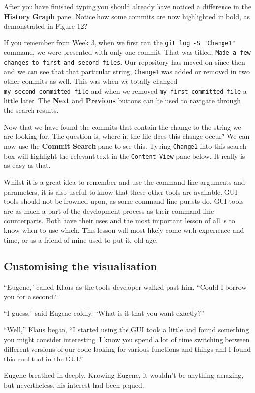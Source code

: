
After you have finished typing you should already have noticed a difference in the \textbf{History Graph} pane.
Notice how some commits are now highlighted in bold, as demonstrated in Figure 12?


If you remember from Week 3, when we first ran the \texttt{git log -S "Change1"} command, we were presented with only one commit.
That was titled, \texttt{Made a few changes to first and second files}.
Our repository has moved on since then and we can see that that particular string, \texttt{Change1} was added or removed in two other commits as well.
This was when we totally changed \texttt{my\_second\_committed\_file} and when we removed \texttt{my\_first\_committed\_file} a little later.
The \textbf{Next} and \textbf{Previous} buttons can be used to navigate through the search results.

Now that we have found the commits that contain the change to the string we are looking for.
The question is, where in the file does this change occur? We can now use the \textbf{Commit Search} pane to see this.
Typing \texttt{Change1} into this search box will highlight the relevant text in the \texttt{Content View} pane below.
It really is as easy as that.

Whilst it is a great idea to remember and use the command line arguments and parameters, it is also useful to know that these other tools are available.
GUI tools should not be frowned upon, as some command line purists do.
GUI tools are as much a part of the development process as their command line counterparts.
Both have their uses and the most important lesson of all is to know when to use which.
This lesson will most likely come with experience and time, or as a friend of mine used to put it, old age.

\subsection{Customising the visualisation}

\begin{trenches}
``Eugene,'' called Klaus as the tools developer walked past him.
``Could I borrow you for a second?''

``I guess,'' said Eugene coldly.
``What is it that you want exactly?''

``Well,'' Klaus began,
``I started using the GUI tools a little and found something you might consider interesting. I know you spend a lot of time switching between different versions of our code looking for various functions and things and I found this cool tool in the GUI.''

Eugene breathed in deeply.
Knowing Eugene, it wouldn't be anything amazing, but nevertheless, his interest had been piqued.
\end{trenches}

